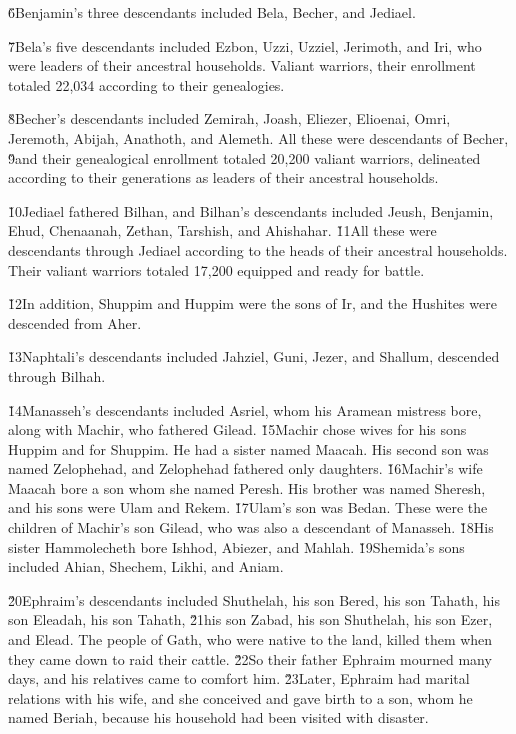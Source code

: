 \v{6}Benjamin's three descendants included Bela, Becher, and Jediael.

\v{7}Bela's five descendants included Ezbon, Uzzi, Uzziel, Jerimoth, and Iri, who were leaders of their ancestral households. Valiant warriors, their enrollment totaled 22,034 according to their genealogies.

\v{8}Becher's descendants included Zemirah, Joash, Eliezer, Elioenai, Omri, Jeremoth, Abijah, Anathoth, and Alemeth. All these were descendants of Becher, \v{9}and their genealogical enrollment totaled 20,200 valiant warriors, delineated according to their generations as leaders of their ancestral households.

\v{10}Jediael fathered Bilhan, and Bilhan's descendants included Jeush, Benjamin, Ehud, Chenaanah, Zethan, Tarshish, and Ahishahar. \v{11}All these were descendants through Jediael according to the heads of their ancestral households. Their valiant warriors totaled 17,200 equipped and ready for battle.

\v{12}In addition, Shuppim and Huppim were the sons of Ir, and the Hushites were descended from Aher.

\v{13}Naphtali's descendants included Jahziel, Guni, Jezer, and Shallum, descended through Bilhah.

\v{14}Manasseh's descendants included Asriel, whom his Aramean mistress bore, along with Machir, who fathered Gilead. \v{15}Machir chose wives for his sons Huppim and for Shuppim. He had a sister named Maacah. His second son was named Zelophehad, and Zelophehad fathered only daughters. \v{16}Machir's wife Maacah bore a son whom she named Peresh. His brother was named Sheresh, and his sons were Ulam and Rekem. \v{17}Ulam's son was Bedan. These were the children of Machir's son Gilead, who was also a descendant of Manasseh. \v{18}His sister Hammolecheth bore Ishhod, Abiezer, and Mahlah. \v{19}Shemida's sons included Ahian, Shechem, Likhi, and Aniam.

\v{20}Ephraim's descendants included Shuthelah, his son Bered, his son Tahath, his son Eleadah, his son Tahath, \v{21}his son Zabad, his son Shuthelah, his son Ezer, and Elead. The people of Gath, who were native to the land, killed them when they came down to raid their cattle. \v{22}So their father Ephraim mourned many days, and his relatives came to comfort him. \v{23}Later, Ephraim had marital relations with his wife, and she conceived and gave birth to a son, whom he named Beriah, because his household had been visited with disaster.

